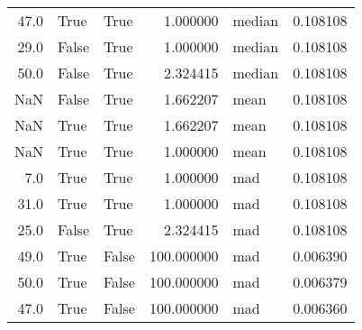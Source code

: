 \begin{table}[htp]
\begin{tabular}{rllrlr}
        47.0 &           True &        True &   1.000000 &      median &  0.108108 \\
        29.0 &          False &        True &   1.000000 &      median &  0.108108 \\
        50.0 &          False &        True &   2.324415 &      median &  0.108108 \\
         NaN &          False &        True &   1.662207 &        mean &  0.108108 \\
         NaN &           True &        True &   1.662207 &        mean &  0.108108 \\
         NaN &           True &        True &   1.000000 &        mean &  0.108108 \\
         7.0 &           True &        True &   1.000000 &         mad &  0.108108 \\
        31.0 &           True &        True &   1.000000 &         mad &  0.108108 \\
        25.0 &          False &        True &   2.324415 &         mad &  0.108108 \\
        49.0 &           True &       False & 100.000000 &         mad &  0.006390 \\
        50.0 &           True &       False & 100.000000 &         mad &  0.006379 \\
        47.0 &           True &       False & 100.000000 &         mad &  0.006360 \\
\bottomrule
\end{tabular}
\end{table}
